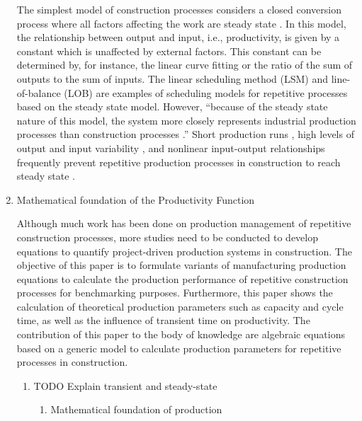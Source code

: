 \documentclass{article}
\begin{document}
\begin{enumerate}
The simplest model of construction processes considers a closed conversion process where all factors affecting the work are steady state \cite{Drewin1982}.
In this model, the relationship between output and input, i.e., productivity, is given by a constant which is unaffected by external factors.
This constant can be determined by, for instance, the linear curve fitting or the ratio of the sum of outputs to the sum of inputs.
The linear scheduling method (LSM) \cite{Harmelink1998,Su2016} and line-of-balance (LOB) \cite{Lumsden1968,Su2016,ZolfagharDolabi2014} are examples of scheduling models for repetitive processes based on the steady state model.
However, ``because of the steady state nature of this model, the system more closely represents industrial production processes than construction processes \cite{Thomas1990}.'' Short production runs \cite{Bashford2005}, high levels of output and input variability \cite{Gonzalez2009}, and nonlinear input-output relationships \cite{Bertelsen2003,Lutz1993} frequently prevent repetitive production processes in construction to reach steady state \cite{Antunes2015a,Walsh2007}.

\item Mathematical foundation of the Productivity Function
\label{sec:orgaccf1e4}

Although much work has been done on production management of repetitive construction processes, more studies need to be conducted to develop equations to quantify project-driven production systems in construction.
The objective of this paper is to formulate variants of manufacturing production equations to calculate the production performance of repetitive construction processes for benchmarking purposes.
Furthermore, this paper shows the calculation of theoretical production parameters such as capacity and cycle time, as well as the influence of transient time on productivity.
The contribution of this paper to the body of knowledge are algebraic equations based on a generic model to calculate production parameters for repetitive processes in construction.
\begin{enumerate}
\item TODO Explain transient and steady-state
\label{sec:org21ef8e8}

\begin{enumerate}
\item Mathematical foundation of production
\label{sec:org85a6bf1}


\end{enumerate}
\end{enumerate}
\end{enumerate}
\end{document}
